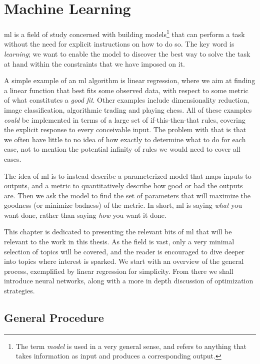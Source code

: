 \documentclass[Thesis.tex]{subfiles}
\begin{document}
\chapter{Machine Learning}
\label{chp:machine-learning}

\glsresetall

\Gls{ml} is a field of study concerned with building
models\footnote{The term \emph{model} is used in a very general sense, and
refers to anything that takes information as input and produces a corresponding
output.} that can perform a task without the need for explicit instructions on
how to do so. The key word is \emph{learning}; we want to enable the model to
discover the best way to solve the task at hand within the constraints that we
have imposed on it.

A simple example of an \gls{ml} algorithm is linear regression, where we aim at
finding a linear function that best fits some observed data, with respect to some
metric of what constitutes a \emph{good fit}. Other examples include
dimensionality reduction, image classification, algorithmic trading and playing
chess. All of these examples \emph{could} be implemented in terms of a
large set of if-this-then-that rules, covering the explicit response to every
conceivable input. The problem with that is that we often have little to no idea
of how exactly to determine what to do for each case, not to mention the
potential infinity of rules we would need to cover all cases.

The idea of \gls{ml} is to instead describe a parameterized model that
maps inputs to outputs, and a metric to quantitatively describe how good or bad
the outputs are. Then we ask the model to find the set of parameters that will
maximize the goodness (or minimize badness) of the metric. In short, \gls{ml}
is saying \emph{what} you want done, rather than saying \emph{how} you
want it done.

This chapter is dedicated to presenting the relevant bits of \gls{ml} that will be
relevant to the work in this thesis. As the field is vast, only a very minimal
selection of topics will be covered, and the reader is encouraged to dive deeper
into topics where interest is sparked. We start with an overview of
the general process, exemplified by linear regression for simplicity. From there
we shall introduce neural networks, along with a more in depth discussion of
optimization strategies.



\section{General Procedure}
\end{document}
